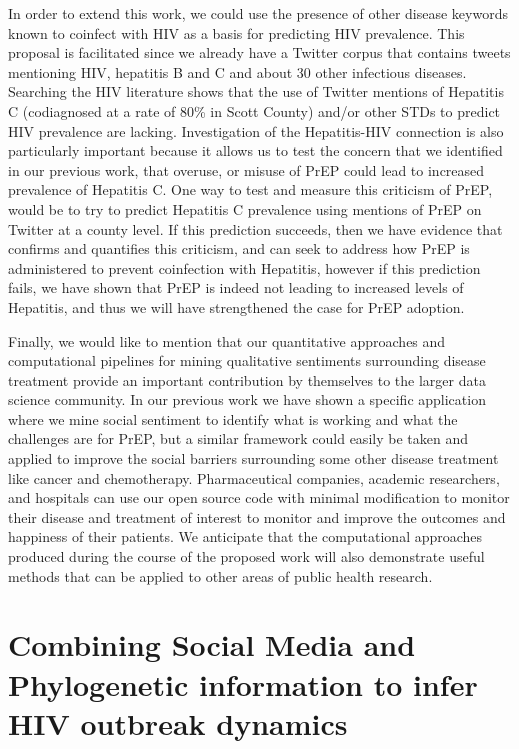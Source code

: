 In order to extend this work, we could use the presence of other disease keywords known to coinfect with HIV as a basis for predicting HIV prevalence. This proposal is facilitated since we already have a Twitter corpus that contains tweets mentioning HIV, hepatitis B and C and about 30 other infectious diseases. Searching the HIV literature shows that the use of Twitter mentions of Hepatitis C (codiagnosed at a rate of 80\% in Scott County) and/or other STDs to predict HIV prevalence are lacking. Investigation of the Hepatitis-HIV connection is also particularly important because it allows us to test the concern that we identified in our previous work, that overuse, or misuse of PrEP could lead to increased prevalence of Hepatitis C. One way to test and measure this criticism of PrEP, would be to try to predict Hepatitis C prevalence using mentions of PrEP on Twitter at a county level. If this prediction succeeds, then we have evidence that confirms and quantifies this criticism, and can seek to address how PrEP is administered to prevent coinfection with Hepatitis, however if this prediction fails, we have shown that PrEP is indeed not leading to increased levels of Hepatitis, and thus we will have strengthened the case for PrEP adoption.

Finally, we would like to mention that our quantitative approaches and computational pipelines for mining qualitative sentiments surrounding disease treatment provide an important contribution by themselves to the larger data science community. In our previous work we have shown a specific application where we mine social sentiment to identify what is working and what the challenges are for PrEP, but a similar framework could easily be taken and applied to improve the social barriers surrounding some other disease treatment like cancer and chemotherapy. Pharmaceutical companies, academic researchers, and hospitals can use our open source code with minimal modification to monitor their disease and treatment of interest to monitor and improve the outcomes and happiness of their patients. We anticipate that the computational approaches produced during the course of the proposed work will also demonstrate useful methods that can be applied to other areas of public health research.


\section{Combining Social Media and Phylogenetic information to infer HIV outbreak dynamics}


